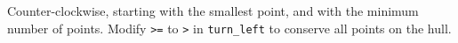 Counter-clockwise, starting with the smallest point, and with the minimum number of points. Modify \texttt{>=} to \texttt{>} in \texttt{turn\_left} to conserve all points on the hull.

